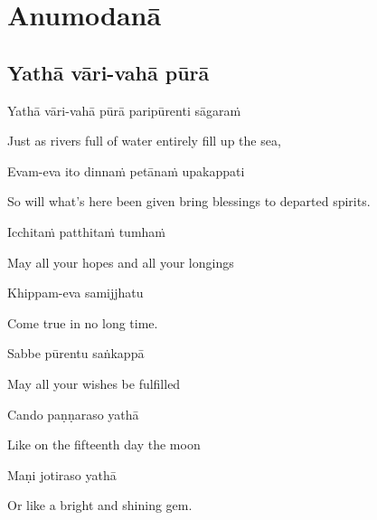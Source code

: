 \chapter{Anumodanā}

\section{Yathā vāri-vahā pūrā}



Yathā vāri-vahā pūrā paripūrenti sāgaraṁ

\begin{cprenglish}
  Just as rivers full of water entirely fill up the sea,
\end{cprenglish}

Evam-eva ito dinnaṁ petānaṁ upakappati

\begin{cprenglish}
  So will what's here been given bring blessings to departed spirits.\\
\end{cprenglish}

Icchitaṁ patthitaṁ tumhaṁ

\begin{cprenglish}
  May all your hopes and all your longings
\end{cprenglish}

Khippam-eva samijjhatu

\begin{cprenglish}
  Come true in no long time.
\end{cprenglish}

Sabbe pūrentu saṅkappā

\begin{cprenglish}
  May all your wishes be fulfilled
\end{cprenglish}

Cando paṇṇaraso yathā

\begin{cprenglish}
  Like on the fifteenth day the moon
\end{cprenglish}

Maṇi jotiraso yathā

\begin{cprenglish}
  Or like a bright and shining gem.\\
\end{cprenglish}

